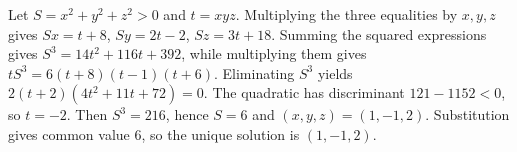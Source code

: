 Let $S=x^2+y^2+z^2>0$ and $t=xyz$. Multiplying the three equalities by $x,y,z$ gives $Sx=t+8$, $Sy=2t-2$, $Sz=3t+18$. Summing the squared expressions gives $S^3=14t^2+116t+392$, while multiplying them gives $tS^3=6(t+8)(t-1)(t+6)$. Eliminating $S^3$ yields $2(t+2)(4t^2+11t+72)=0$. The quadratic has discriminant $121-1152<0$, so $t=-2$. Then $S^3=216$, hence $S=6$ and $(x,y,z)=(1,-1,2)$. Substitution gives common value $6$, so the unique solution is $\boxed{(1,-1,2)}$.
